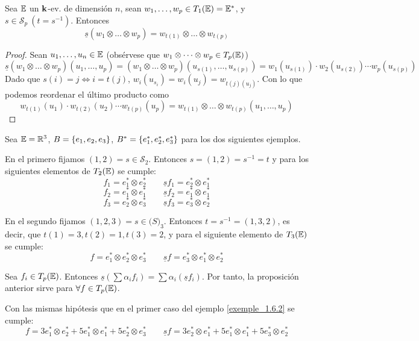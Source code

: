 \begin{prop}
    Sea $\mathbb{E}$ un $\mathbf{k}$-ev. de dimensión $n$, sean $w_1, \dots, w_p \in T_1(\mathbb{E}) = \mathbb{E}^\ast$, 
    y $s \in \mathcal{S}_p \ (t = s^{-1})$. Entonces 
    \[\underline{s}(w_1 \otimes \dots \otimes w_p) = w_{t(1)}
    \otimes \dots \otimes w_{t(p)}\]
\end{prop}
\begin{proof}
    Sean $u_1, \dots, u_n \in \mathbb{E}$ (obsérvese que $w_1 \otimes \dots \otimes w_p \in T_p(\mathbb{E})$)
    \[\underline{s}(w_1 \otimes \dots \otimes w_p)(u_1,\dots, u_p) = (w_1 \otimes 
    \dots \otimes w_p)(u_{s(1)}, \dots, u_{s(p)}) = w_1(u_{s(1)}) \cdot w_2(u_{s(2)}) 
    \cdots w_p(u_{s(p)})\]
    Dado que $s(i) = j \iff i = t(j)$, $w_i(u_{s_i}) = w_i(u_j) = w_{t(j)(u_j)}$. Con lo
    que podemos reordenar el último producto como
    \[w_{t(1)}(u_1) \cdot w_{t(2)}(u_2) \cdots w_{t(p)}(u_p) =w_{t(1)}
    \otimes \dots \otimes w_{t(p)}(u_1,\dots, u_p)\]
\end{proof}
\begin{example}
    \label{exemple_1.6.2}
    Sea $\mathbb{E}=\mathbb{R}^3$, $B = \left\{e_1,e_2,e_3\right\}$, $B^\ast = 
    \left\{e_1^\ast, e_2^\ast, e_3^\ast\right\}$ para los dos siguientes ejemplos.

    En el primero fijamos $(1,2) = s \in \mathcal{S}_2$. Entonces 
    $s = (1,2) = s^{-1}=t$ y para los siguientes elementos de $T_2(\mathbb{E})$ se cumple:
    \[f_1=e_1^\ast \otimes e_2^\ast \qquad \underline{s} f_1 = e_2^\ast \otimes 
    e_1^\ast\]
    \[f_2=e_1^\ast \otimes e_1^\ast \qquad \underline{s} f_2 = e_1^\ast \otimes 
    e_1^\ast\]
    \[f_3=e_2^\ast \otimes e_3^\ast \qquad \underline{s} f_3 = e_3^\ast \otimes 
    e_2^\ast\]

    En el segundo fijamos $(1,2,3) = s \in \mathcal(S)_3$. Entonces $t = s^{-1} = 
    (1, 3, 2)$, es decir, que $t(1) = 3, t(2) = 1, t(3) = 2$, y para el siguiente 
    elemento de $T_3(\mathbb{E})$ se cumple:
    \[f = e_1^\ast \otimes e_2^\ast \otimes e_3^\ast \qquad 
    \underline{s} f =  e_3^\ast \otimes e_1^\ast \otimes e_2^\ast\]
\end{example}
\begin{obs}
\label{obs_1.6.1}
    Sea $f_i \in T_p(\mathbb{E})$. Entonces $\underline{s}(\sum \alpha_i f_i) = \sum \alpha_i 
    (\underline{s} f_i)$.
    Por tanto, la proposición anterior sirve para $\forall f \in T_p(\mathbb{E})$.
\end{obs}
\begin{example}
    Con las mismas hipótesis que en el primer caso del ejemplo \ref{exemple_1.6.2} 
    se cumple:
    \[f = 3e_1^\ast \otimes e_2^\ast + 5e_1^\ast \otimes e_1^\ast + 5e_2^\ast \otimes
    e_3^\ast \qquad \underline{s}f = 3e_2^\ast \otimes e_1^\ast + 5e_1^\ast \otimes e_1^\ast 
    + 5e_3^\ast \otimes e_2^\ast\]
\end{example}
